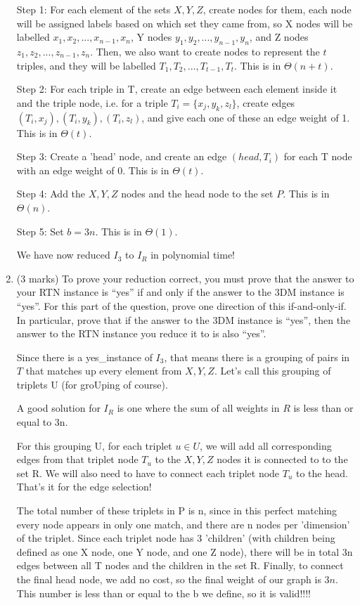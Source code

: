 \documentclass[11pt]{article}
\begin{document}
\begin{enumerate}
\begin{soln}
Step 1: For each element of the sets $X, Y, Z$, create nodes for them, each node will be assigned labels based on which set they came from, so X nodes will be labelled $x_1,x_2,...,x_{n-1},x_n$, Y nodes $y_1,y_2,...,y_{n-1},y_n$, and Z nodes $z_1,z_2,...,z_{n-1},z_n$. Then, we also want to create nodes to represent the $t$ triples, and they will be labelled $T_1, T_2,...,T_{t-1},T_t$. This is in $\Theta(n + t)$.

Step 2: For each triple in T, create an edge between each element inside it and the triple node, i.e. for a triple $T_i = \{x_j, y_k, z_l\}$, create edges $(T_i, x_j), (T_i,  y_k), (T_i, z_l)$, and give each one of these an edge weight of 1. This is in $\Theta(t)$.

Step 3: Create a 'head' node, and create an edge $(head, T_i)$ for each T node with an edge weight of 0. This is in $\Theta(t)$.

Step 4: Add the $X, Y, Z$ nodes and the head node to the set $P$.  This is in $\Theta(n)$.

Step 5: Set $b=3n$.  This is in $\Theta(1)$.

We have now reduced $I_3$ to $I_R$ in polynomial time!
\end{soln}

\item (3 marks)
To prove your reduction correct, you must prove that
the answer to your RTN instance is ``yes'' if and only if
the answer to the 3DM instance is ``yes''.  For this part of the question,
prove one direction of this if-and-only-if.  In particular, prove
that if the answer to the 3DM instance is ``yes'', then the
answer to the RTN instance you reduce it to is also ``yes''.

\begin{soln}
Since there is a yes\_instance of $I_3$, that means there is a grouping of pairs in $T$ that matches up every element from $X,Y,Z$. Let's call this grouping of triplets U (for groUping of course). 

A good solution for $I_R$ is one where the sum of all weights in $R$ is less than or equal to 3n. 

For this grouping U, for each triplet $u \in U$, we will add all corresponding edges from that triplet node $T_u$ to the $X,Y,Z$ nodes it is connected to to the set R. We will also need to have to connect each triplet node $T_u$ to the head. That's it for the edge selection! 

The total number of these triplets in P is n, since in this perfect matching every node appears in only one match, and there are n nodes per 'dimension' of the triplet. Since each triplet node has 3 'children' (with children being defined as one X node, one Y node, and one Z node), there will be in total 3n edges between all T nodes and the children in the set R. Finally, to connect the final head node, we add no cost, so the final weight of our graph is $3n$. This number is less than or equal to the b we define, so it is valid!!!!


\end{soln}
\end{enumerate}
\end{document}
